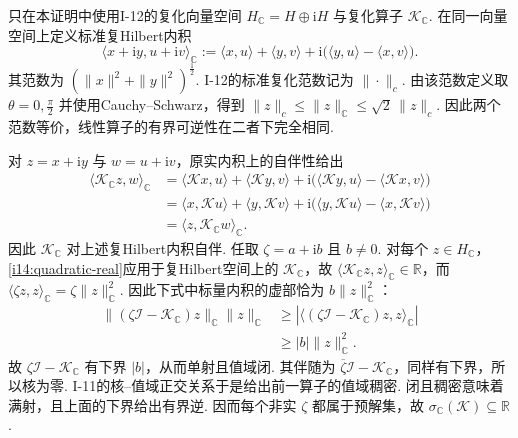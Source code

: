 \begin{FAProof}
只在本证明中使用I-12的复化向量空间 \(\displaystyle H_{\mathbb C}=H\oplus\mathrm{i}H\) 与复化算子 \(\displaystyle \mathcal K_{\mathbb C}\). 在同一向量空间上定义标准复Hilbert内积
\[
\langle x+\mathrm{i}y,u+\mathrm{i}v\rangle_{\mathbb C}
:=
\langle x,u\rangle+\langle y,v\rangle
+
\mathrm{i}\bigl(\langle y,u\rangle-\langle x,v\rangle\bigr).
\]
其范数为 \(\displaystyle (\|x\|^2+\|y\|^2)^{\frac{1}{2}}\). I-12的标准复化范数记为 \(\displaystyle \|\cdot\|_{c}\). 由该范数定义取 \(\displaystyle \theta=0,\frac{\pi}{2}\) 并使用Cauchy--Schwarz，得到
\(\displaystyle \|z\|_{c} \leqslant \|z\|_{\mathbb C} \leqslant \sqrt2\,\|z\|_{c}\).
因此两个范数等价，线性算子的有界可逆性在二者下完全相同.

对 \(\displaystyle z=x+\mathrm{i}y\) 与 \(\displaystyle w=u+\mathrm{i}v\)，原实内积上的自伴性给出
\[
\begin{aligned}
\displaystyle \langle\mathcal K_{\mathbb C}z,w\rangle_{\mathbb C}
&\displaystyle =
\langle\mathcal Kx,u\rangle+\langle\mathcal Ky,v\rangle
+\mathrm{i}\bigl(\langle\mathcal Ky,u\rangle-\langle\mathcal Kx,v\rangle\bigr)\\
&\displaystyle =
\langle x,\mathcal Ku\rangle+\langle y,\mathcal Kv\rangle
+\mathrm{i}\bigl(\langle y,\mathcal Ku\rangle-\langle x,\mathcal Kv\rangle\bigr)\\
&\displaystyle =
\langle z,\mathcal K_{\mathbb C}w\rangle_{\mathbb C}.
\end{aligned}
\]
因此 \(\displaystyle \mathcal K_{\mathbb C}\) 对上述复Hilbert内积自伴. 任取 \(\displaystyle \zeta=a+\mathrm{i}b\) 且 \(\displaystyle b\neq0\). 对每个 \(\displaystyle z\in H_{\mathbb C}\)，\autoref{i14:quadratic-real}应用于复Hilbert空间上的 \(\displaystyle \mathcal K_{\mathbb C}\)，故 \(\displaystyle \langle\mathcal K_{\mathbb C}z,z\rangle_{\mathbb C}\in\mathbb R\)，而 \(\displaystyle \langle\zeta z,z\rangle_{\mathbb C}=\zeta\|z\|_{\mathbb C}^2\). 因此下式中标量内积的虚部恰为 \(\displaystyle b\|z\|_{\mathbb C}^2\)：
\[
\begin{aligned}
\displaystyle \| (\zeta\mathcal I-\mathcal K_{\mathbb C})z\|_{\mathbb C}\|z\|_{\mathbb C}
&\displaystyle \geqslant
|\langle(\zeta\mathcal I-\mathcal K_{\mathbb C})z,z\rangle_{\mathbb C}|\\
&\displaystyle \geqslant
|b|\|z\|_{\mathbb C}^2.
\end{aligned}
\]
故 \(\displaystyle \zeta\mathcal I-\mathcal K_{\mathbb C}\) 有下界 \(\displaystyle |b|\)，从而单射且值域闭. 其伴随为 \(\displaystyle \overline\zeta\mathcal I-\mathcal K_{\mathbb C}\)，同样有下界，所以核为零. I-11的核--值域正交关系于是给出前一算子的值域稠密. 闭且稠密意味着满射，且上面的下界给出有界逆. 因而每个非实 \(\displaystyle \zeta\) 都属于预解集，故 \(\displaystyle \sigma_{\mathbb C}(\mathcal K)\subseteq\mathbb R\).


\end{FAProof}
